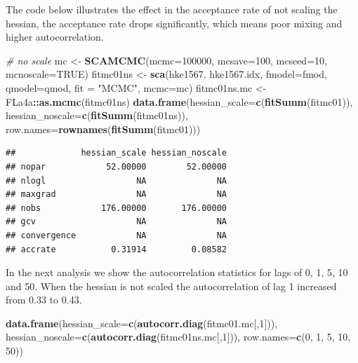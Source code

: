 \documentclass[
]{book}
\newenvironment{Shaded}{\begin{snugshade}}{\end{snugshade}}
\newcommand{\AttributeTok}[1]{\textcolor[rgb]{0.13,0.29,0.53}{#1}}
\newcommand{\CommentTok}[1]{\textcolor[rgb]{0.56,0.35,0.01}{\textit{#1}}}
\newcommand{\ConstantTok}[1]{\textcolor[rgb]{0.56,0.35,0.01}{#1}}
\newcommand{\DecValTok}[1]{\textcolor[rgb]{0.00,0.00,0.81}{#1}}
\newcommand{\FunctionTok}[1]{\textcolor[rgb]{0.13,0.29,0.53}{\textbf{#1}}}
\newcommand{\NormalTok}[1]{#1}
\newcommand{\OtherTok}[1]{\textcolor[rgb]{0.56,0.35,0.01}{#1}}
\newcommand{\SpecialCharTok}[1]{\textcolor[rgb]{0.81,0.36,0.00}{\textbf{#1}}}
\newcommand{\StringTok}[1]{\textcolor[rgb]{0.31,0.60,0.02}{#1}}
\begin{document}
The code below illustrates the effect in the acceptance rate of not scaling the hessian, the acceptance rate drops significantly, which means poor mixing and higher autocorrelation.

\begin{Shaded}
\begin{Highlighting}[]
\CommentTok{\# no scale}
\NormalTok{mc }\OtherTok{\textless{}{-}} \FunctionTok{SCAMCMC}\NormalTok{(}\AttributeTok{mcmc=}\DecValTok{100000}\NormalTok{, }\AttributeTok{mcsave=}\DecValTok{100}\NormalTok{, }\AttributeTok{mcseed=}\DecValTok{10}\NormalTok{, }\AttributeTok{mcnoscale=}\ConstantTok{TRUE}\NormalTok{)}
\NormalTok{fitmc01ns }\OtherTok{\textless{}{-}} \FunctionTok{sca}\NormalTok{(hke1567, hke1567.idx, }\AttributeTok{fmodel=}\NormalTok{fmod, }\AttributeTok{qmodel=}\NormalTok{qmod, }\AttributeTok{fit =} \StringTok{"MCMC"}\NormalTok{, }\AttributeTok{mcmc=}\NormalTok{mc)}
\NormalTok{fitmc01ns.mc }\OtherTok{\textless{}{-}}\NormalTok{ FLa4a}\SpecialCharTok{::}\FunctionTok{as.mcmc}\NormalTok{(fitmc01ns)}
\FunctionTok{data.frame}\NormalTok{(}\AttributeTok{hessian\_scale=}\FunctionTok{c}\NormalTok{(}\FunctionTok{fitSumm}\NormalTok{(fitmc01)),}
    \AttributeTok{hessian\_noscale=}\FunctionTok{c}\NormalTok{(}\FunctionTok{fitSumm}\NormalTok{(fitmc01ns)),}
    \AttributeTok{row.names=}\FunctionTok{rownames}\NormalTok{(}\FunctionTok{fitSumm}\NormalTok{(fitmc01)))}
\end{Highlighting}
\end{Shaded}

\begin{verbatim}
##             hessian_scale hessian_noscale
## nopar            52.00000        52.00000
## nlogl                  NA              NA
## maxgrad                NA              NA
## nobs            176.00000       176.00000
## gcv                    NA              NA
## convergence            NA              NA
## accrate           0.31914         0.08582
\end{verbatim}

In the next analysis we show the autocorrelation statistics for lags of 0, 1, 5, 10 and 50. When the hessian is not scaled the autocorrelation of lag 1 increased from 0.33 to 0.43.

\begin{Shaded}
\begin{Highlighting}[]
\FunctionTok{data.frame}\NormalTok{(}\AttributeTok{hessian\_scale=}\FunctionTok{c}\NormalTok{(}\FunctionTok{autocorr.diag}\NormalTok{(fitmc01.mc[,}\DecValTok{1}\NormalTok{])),}
    \AttributeTok{hessian\_noscale=}\FunctionTok{c}\NormalTok{(}\FunctionTok{autocorr.diag}\NormalTok{(fitmc01ns.mc[,}\DecValTok{1}\NormalTok{])),}
    \AttributeTok{row.names=}\FunctionTok{c}\NormalTok{(}\DecValTok{0}\NormalTok{, }\DecValTok{1}\NormalTok{, }\DecValTok{5}\NormalTok{, }\DecValTok{10}\NormalTok{, }\DecValTok{50}\NormalTok{))}
\end{Highlighting}
\end{Shaded}
\end{document}
